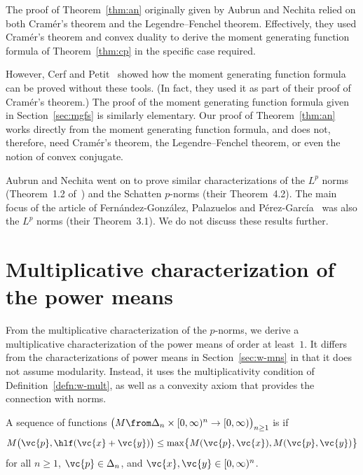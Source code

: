 \begin{remark}
% 
The proof of Theorem~\ref{thm:an} originally given by Aubrun%
%
%
and Nechita%
%
%
relied on both Cram\'er's theorem and the Legendre--Fenchel theorem.
Effectively, they used Cram\'er's theorem and convex duality to derive the
moment generating function formula of Theorem~\ref{thm:cp} in the specific
case required.

However, Cerf%
%
% 
and Petit~\cite{CePe}%
%
% 
showed how the moment generating function formula can be proved without
these tools. (In fact, they used it as part of their proof of Cram\'er's
theorem.)  The proof of the moment generating function formula given in
Section~\ref{sec:mgfs} is similarly elementary.  Our proof of
Theorem~\ref{thm:an} works directly from the moment generating function
formula, and does not, therefore, need Cram\'er's theorem, the
Legendre--Fenchel theorem, or even the notion of convex conjugate.

Aubrun and Nechita went on to prove similar characterizations of the $L^p$
norms (Theorem~1.2 of~\cite{AuNe}) and the Schatten $p$-norms (their
Theorem~4.2).  The main focus of the article of Fern\'andez-Gonz\'alez,
Palazuelos and P\'erez-Garc\'{i}a~\cite{FGPPG} was also the $L^p$ norms
(their Theorem~3.1).  We do not discuss these results further.
\end{remark}


\section{Multiplicative characterization of the power means}


From the multiplicative characterization of the $p$-norms, we derive a
multiplicative characterization of the power means of order at least~$1$.
It differs from the characterizations of power means in
Section~\ref{sec:w-mns} in that it does not assume modularity.  Instead, it
uses the multiplicativity condition of Definition~\ref{defn:w-mult}, as
well as a convexity axiom that provides the connection with norms.

\begin{defn}
A sequence of functions $\bigl( M \from \Delta_n \times [0, \infty)^n \to
[0, \infty) \bigr)_{n \geq 1}$ is %
%
%
% 
if
\[
M\bigl( \vc{p}, \hlf(\vc{x} + \vc{y}) \bigr)
\leq
\max\bigl\{ M(\vc{p}, \vc{x}), M(\vc{p}, \vc{y}) \bigr\}
\]
for all $n \geq 1$, $\vc{p} \in \Delta_n$, and $\vc{x}, \vc{y} \in [0,
\infty)^n$. 
\end{defn}

